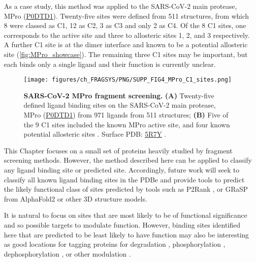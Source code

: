 As a case study, this method was applied to the SARS-CoV-2 main protease, MPro (\href{https://www.uniprot.org/uniprotkb/P0DTD1/entry}{P0DTD1}). Twenty-five sites were defined from 511 structures, from which 8 were classed as C1, 12 as C2, 3 as C3 and only 2 as C4. Of the 8 C1 sites, one corresponds to the active site and three to allosteric sites 1, 2, and 3 \cite{DASGUPTA_2022_ALLOSTERIC} respectively. A further C1 site is at the dimer interface and known to be a potential allosteric site \cite{DOUANGAMATH_2020_SARSCOV2} (\autoref{fig:MPro_showcase}). The remaining three C1 sites may be important, but each binds only a single ligand and their function is currently unclear.

\begin{figure}[htb!]
    \centering
    \texttt{[image: figures/ch\_FRAGSYS/PNG/SUPP\_FIG4\_MPro\_C1\_sites.png]}
    \caption[SARS-CoV-2 MPro fragment screening]{\textbf{SARS-CoV-2 MPro fragment screening.} \textbf{(A)} Twenty-five defined ligand binding sites on the SARS-CoV-2 main protease, MPro (\href{https://www.uniprot.org/uniprotkb/P0DTD1/entry}{P0DTD1}) from 971 ligands from 511 structures; \textbf{(B)} Five of the 9 C1 sites included the known MPro active site, and four known potential allosteric sites \cite{DOUANGAMATH_2020_SARSCOV2, DASGUPTA_2022_ALLOSTERIC}. Surface PDB: \href{https://www.ebi.ac.uk/pdbe/entry/pdb/5R7Y}{5R7Y} \cite{DOUANGAMATH_2020_SARSCOV2}.}
    \label{fig:MPro_showcase}
\end{figure}

This Chapter focuses on a small set of proteins heavily studied by fragment screening methods. However, the method described here can be applied to classify any ligand binding site or predicted site. Accordingly, future work will seek to classify all known ligand binding sites in the PDBe and provide tools to predict the likely functional class of sites predicted by tools such as P2Rank \cite{KRIVAK_2018_P2RANK}, or GRaSP \cite{SANTANA_2020_GRaSP, SANTANA_2022_GRaSP} from AlphaFold2 \cite{JUMPER_2021_ALPHAFOLD, VARADI_2022_ALPHAFOLDDB} or other 3D structure models.

It is natural to focus on sites that are most likely to be of functional significance and so possible targets to modulate function. However, binding sites identified here that are predicted to be least likely to have function may also be interesting as good locations for tagging proteins for degradation \cite{BEKES_2022_PROTACS}, phosphorylation \cite{SIRIWARDENA_2020_PHOSPHO}, dephosphorylation \cite{SIMPSON_2023_ADPROM}, or other modulation \cite{HEITEL_2023_PTMS, PENG_2023_PTMS}.

